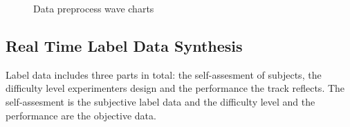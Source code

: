 \documentclass[runningheads,a4paper]{llncs}
\begin{document}
\begin{figure}
  \centering
 \hspace{1cm}

 \hspace{1cm}

  \caption{Data preprocess wave charts}
  \label{fig:wave} %
\end{figure}

\subsection{Real Time Label Data Synthesis}
Label data includes three parts in total: the self-assesment of subjects, the difficulty
level experimenters design and the performance the track reflects. The self-assesment
is the subjective label data and the difficulty level and the performance are the
objective data.
\end{document}
